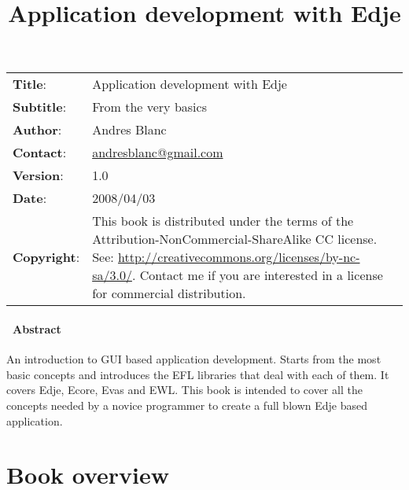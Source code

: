 \documentclass[12pt,a4paper,english]{book}
\title{Application development with Edje}
\author{}
\date{}
\newlength{\docinfowidth}
\newlength{\locallinewidth}
\begin{document}
\maketitle
\begin{center}
\begin{tabularx}{\docinfowidth}{lX}
\textbf{Title}: &
	Application development with Edje \\
\textbf{Subtitle}: &
	From the very basics \\
\textbf{Author}: &
	Andres Blanc \\
\textbf{Contact}: &
	\href{mailto:andresblanc@gmail.com}{andresblanc@gmail.com} \\
\textbf{Version}: &
	1.0 \\
\textbf{Date}: &
	2008/04/03 \\
\textbf{Copyright}: &
	This book is distributed under the terms of the Attribution-NonCommercial-ShareAlike
CC license. See: \href{http://creativecommons.org/licenses/by-nc-sa/3.0/}{http://creativecommons.org/licenses/by-nc-sa/3.0/}.
Contact me if you are interested in a license for commercial
distribution. \\
\end{tabularx}
\end{center}

\setlength{\locallinewidth}{\linewidth}


\subsubsection*{~\hfill Abstract\hfill ~}

An introduction to GUI based application development. Starts from
the most basic concepts and introduces the EFL libraries that deal
with each of them. It covers Edje, Ecore, Evas and EWL. This book
is intended to cover all the concepts needed by a novice programmer
to create a full blown Edje based application.

\hypertarget{contents}{}
\renewcommand{\contentsname}{Contents}
\tableofcontents

\bigskip
\label{contents}



\hypertarget{book-overview}{}
\chapter{Book overview}
\label{book-overview}
\end{document}
